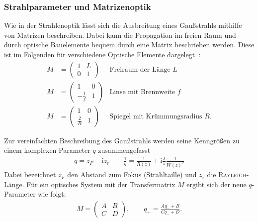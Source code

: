\documentclass[a4paper,twoside,final]{article}
\begin{document}
\subsubsection{Strahlparameter und Matrizenoptik}
Wie in der Strahlenoptik lässt sich die Ausbreitung eines Gaußstrahls mithilfe von Matrizen beschreiben. Dabei kann die Propagation im freien Raum und durch optische Bauelemente bequem durch eine Matrix beschrieben werden. Diese ist im Folgenden für verschiedene Optische Elemente dargelegt~\cite{Peschel}:
\begin{align}
  M &= \begin{pmatrix}
    1 & L \\ 0 & 1
\end{pmatrix} & \text{Freiraum der Länge }L \label{eqn:Matrix_Freiraum}\\
  M &= \begin{pmatrix}
  1 & 0 \\ -\frac{1}{f} & 1
\end{pmatrix} & \text{Linse mit Brennweite }f \label{eqn:Matrix_Brennweite}\\
  M &= \begin{pmatrix}
  1 & 0 \\ \frac{2}{R} & 1
\end{pmatrix} & \text{Spiegel mit Krümmungsradius }R.
\end{align}

Zur vereinfachten Beschreibung des Gaußstrahls werden seine Kenngrößen zu einem komplexen Parameter $q$ zusammengefasst
\begin{align}\label{eqn:q-Parameter}
  q = z_F - \mathrm{i} z_r \qquad \frac{1}{q} = \frac{1}{R(z)} + \mathrm{i}\frac{\lambda}{\pi}\frac{1}{W(z)^2}
\end{align}
Dabei bezeichnet $z_F$ den Abstand zum Fokus (Strahltaille) und $z_r$ die \textsc{Rayleigh}-Länge. Für ein optisches System mit der Transfermatrix $M$ ergibt sich der neue $q$-Parameter wie folgt:
\begin{align}\label{eqn:Transfermatrix}
  M = \begin{pmatrix}
    A & B \\ C & D
\end{pmatrix}, \qquad q_+ = \frac{A q_- + B}{C q_- + D}.
\end{align}
\end{document}
